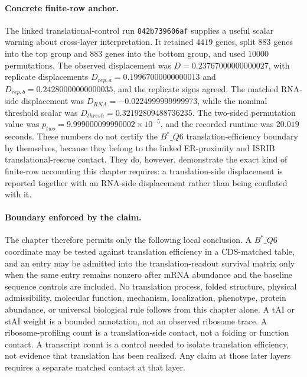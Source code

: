 \paragraph{Concrete finite-row anchor.} The linked translational-control run \texttt{842b739606af} supplies a useful scalar warning about cross-layer interpretation.  It retained $4419$ genes, split $883$ genes into the top group and $883$ genes into the bottom group, and used $10000$ permutations.  The observed displacement was $D=0.23767000000000027$, with replicate displacements $D_{rep,a}=0.19967000000000013$ and $D_{rep,b}=0.24280000000000035$, and the replicate signs agreed.  The matched RNA-side displacement was $D_{RNA}=-0.0224999999999973$, while the nominal threshold scalar was $D_{thresh}=0.32192809488736235$.  The two-sided permutation value was $p_{two}=9.999000099990002\times 10^{-5}$, and the recorded runtime was $20.019$ seconds.  These numbers do not certify the $B^*\_{Q6}$ translation-efficiency boundary by themselves, because they belong to the linked ER-proximity and ISRIB translational-rescue contact.  They do, however, demonstrate the exact kind of finite-row accounting this chapter requires: a translation-side displacement is reported together with an RNA-side displacement rather than being conflated with it.

\paragraph{Boundary enforced by the claim.} The chapter therefore permits only the following local conclusion.  A $B^*\_{Q6}$ coordinate may be tested against translation efficiency in a CDS-matched table, and an entry may be admitted into the translation-readout survival matrix only when the same entry remains nonzero after mRNA abundance and the baseline sequence controls are included.  No translation process, folded structure, physical admissibility, molecular function, mechanism, localization, phenotype, protein abundance, or universal biological rule follows from this chapter alone.  A tAI or stAI weight is a bounded annotation, not an observed ribosome trace.  A ribosome-profiling count is a translation-side contact, not a folding or function contact.  A transcript count is a control needed to isolate translation efficiency, not evidence that translation has been realized.  Any claim at those later layers requires a separate matched contact at that layer.

